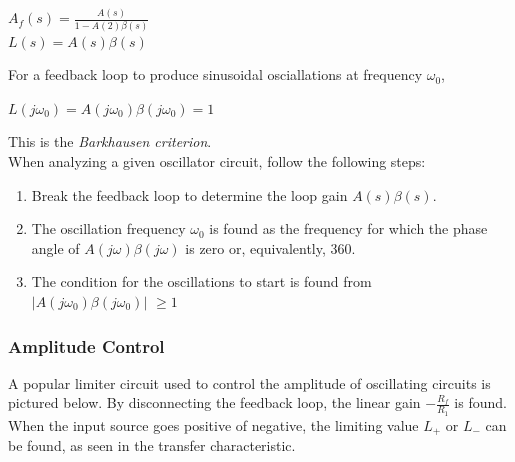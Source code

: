\documentclass[11pt]{article}
\begin{document}
    \begin{center}
        $A_f(s) = \frac{A(s)}{1-A(2)\beta(s)}$ \\
        
        $L(s) = A(s)\beta(s)$       
    \end{center}
    
    For a feedback loop to produce sinusoidal osciallations at frequency $\omega_0$,

    \begin{center}
        $L(j\omega_0) = A(j\omega_0)\beta(j\omega_0) = 1$
    \end{center}
    
    This is the \textit{Barkhausen criterion}. \\
    

    When analyzing a given oscillator circuit, follow the following steps:

    \begin{enumerate}
        \item Break the feedback loop to determine the loop gain $A(s)\beta(s)$.
        \item The oscillation frequency $\omega_0$ is found as the frequency for which the phase angle of $A(j\omega)\beta(j\omega)$ is zero or, equivalently, 360.
        \item The condition for the oscillations to start is found from \\
        $|A(j\omega_0)\beta(j\omega_0)|$ $\geq 1$
    \end{enumerate}
    \subsubsection{Amplitude Control}
    A popular limiter circuit used to control the amplitude of oscillating circuits is pictured below. By disconnecting the feedback loop, the linear gain $-\frac{R_f}{R_1}$ is found. When the input source goes positive of negative, the limiting value $L_+$ or $L_-$ can be found, as seen in the transfer characteristic. \\
    
\end{document}
